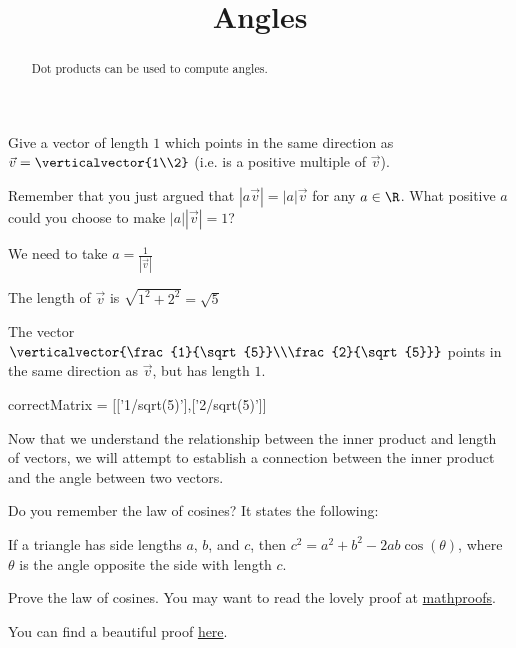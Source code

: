 \documentclass{ximera}
\title{Angles}
\begin{document}
\begin{abstract}
  Dot products can be used to compute angles.
\end{abstract}

\begin{question}
  Give a vector of length $1$ which points in the same direction as $\vec{v} = \verticalvector{1\\2}$ (i.e. is a positive multiple of $\vec{v}$). 
  \begin{solution}
    
    \begin{hint}
      Remember that you just argued that $|a\vec{v}| =|a|\vec{v}$ for any $a\in \R$.  What positive $a$ could you choose to make $|a||\vec{v}| = 1$?
    \end{hint}
    \begin{hint}
      We need to take $a = \frac{1}{|\vec{v}|}$
    \end{hint}
    \begin{hint}
      The length of $\vec{v}$ is $\sqrt{1^2+2^2} = \sqrt{5}$
    \end{hint}
    \begin{hint}
      The vector $\verticalvector{\frac{1}{\sqrt{5}}\\\frac{2}{\sqrt{5}}}$ points in the same direction as $\vec{v}$, but has length $1$.
    \end{hint}
    \begin{matrix-answer}
      correctMatrix = [['1/sqrt(5)'],['2/sqrt(5)']]
    \end{matrix-answer}
  \end{solution}
\end{question}	

Now that we understand the relationship between the inner product and
length of vectors, we will attempt to establish a connection between
the inner product and the angle between two vectors.

Do you remember the law of cosines?  It states the following:

\begin{theorem}
  If a triangle has side lengths $a$, $b$, and $c$, then $c^2 = a^2+b^2 - 2ab\cos(\theta)$, where $\theta$ is the angle opposite the side with length $c$.
\end{theorem}

Prove the law of cosines.  You may want to read the lovely proof at \href{http://mathproofs.blogspot.com/2006/06/law-of-cosines.html}{mathproofs}.
\begin{free-response}
  You can find a beautiful proof \href{http://mathproofs.blogspot.com/2006/06/law-of-cosines.html}{here}.
\end{free-response}
\end{document}
